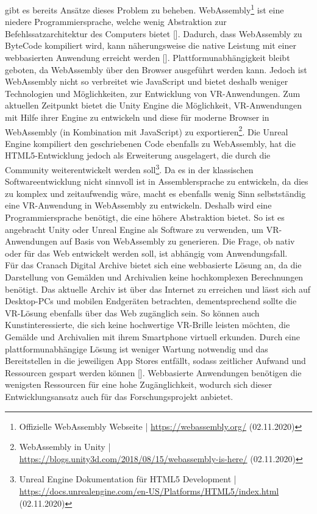 \documentclass[a4paper,12pt,oneside]{article}
\begin{document}
        gibt es bereits Ansätze dieses Problem zu beheben. WebAssembly\footnote{Offizielle WebAssembly Webseite | \url{https://webassembly.org/} (02.11.2020)}
        ist eine niedere Programmiersprache, welche wenig Abstraktion zur Befehlssatzarchitektur
        des Computers bietet [\cite[185]{Haas2017Jun}]. Dadurch, dass WebAssembly zu ByteCode
        kompiliert wird, kann näherungsweise die native Leistung mit einer webbasierten Anwendung 
        erreicht werden [\cite[186]{Haas2017Jun}]. 
        Plattformunabhängigkeit bleibt geboten,
        da WebAssembly über den Browser ausgeführt werden kann.
        Jedoch ist WebAssembly nicht
        so verbreitet wie JavaScript und bietet deshalb weniger Technologien und Möglichkeiten,
        zur Entwicklung von VR-Anwendungen. Zum aktuellen Zeitpunkt bietet die Unity Engine
        die Möglichkeit, VR-Anwendungen mit Hilfe ihrer Engine zu entwickeln und
        diese für moderne Browser in WebAssembly (in Kombination mit JavaScript) 
        zu exportieren\footnote{WebAssembly in Unity | \url{https://blogs.unity3d.com/2018/08/15/webassembly-is-here/} (02.11.2020)}.
        Die Unreal Engine kompiliert den geschriebenen Code ebenfalls zu WebAssembly,
        hat die HTML5-Entwicklung jedoch als Erweiterung ausgelagert, die durch
        die Community weiterentwickelt werden soll\footnote{Unreal Engine Dokumentation für HTML5 Development | \url{https://docs.unrealengine.com/en-US/Platforms/HTML5/index.html} (02.11.2020)}.
        Da es in der klassischen Softwareentwicklung nicht sinnvoll ist in Assemblersprache
        zu entwickeln, da dies zu komplex und zeitaufwendig wäre, 
        macht es ebenfalls wenig Sinn selbstständig eine VR-Anwendung in 
        WebAssembly zu entwickeln. Deshalb wird eine Programmiersprache benötigt, die
        eine höhere Abstraktion bietet. So ist es angebracht Unity oder Unreal Engine 
        als Software zu verwenden,
        um VR-Anwendungen auf Basis von WebAssembly zu generieren.
        Die Frage, ob nativ oder für das Web entwickelt werden soll, 
        ist abhängig vom Anwendungsfall. \\
        Für das Cranach Digital Archive bietet sich eine webbasierte Lösung
        an, da die Darstellung von Gemälden und Archivalien keine hochkomplexen Berechnungen
        benötigt. Das aktuelle Archiv ist über das Internet zu erreichen und lässt sich auf
        Desktop-PCs und mobilen Endgeräten betrachten, dementsprechend 
        sollte die VR-Lösung ebenfalls
        über das Web zugänglich sein. So können auch Kunstinteressierte, die sich keine hochwertige
        VR-Brille leisten möchten, die Gemälde und Archivalien mit ihrem Smartphone
        virtuell erkunden.
        Durch eine plattformunabhängige Lösung ist weniger Wartung notwendig und das
        Bereitstellen in die jeweiligen App Stores entfällt, sodass zeitlicher Aufwand und
        Ressourcen gespart werden können [\cite[248]{Ater2017}]. Webbasierte Anwendungen 
        benötigen die wenigsten Ressourcen für eine hohe Zugänglichkeit, wodurch sich dieser
        Entwicklungsansatz auch für das Forschungsprojekt anbietet.
\end{document}
